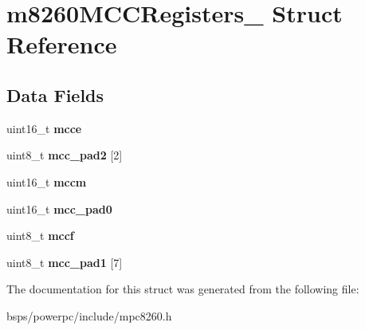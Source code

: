 \hypertarget{structm8260MCCRegisters__}{}\section{m8260\+M\+C\+C\+Registers\+\_\+ Struct Reference}
\label{structm8260MCCRegisters__}
\subsection*{Data Fields}
\begin{DoxyCompactItemize}
\item 
\mbox{\label{structm8260MCCRegisters___ac1afb10db9f2e528785d8507d55b3d5f}} 
uint16\+\_\+t {\bfseries mcce}
\item 
\mbox{\label{structm8260MCCRegisters___a15b07c55f206abc4ef4155d7b5a9d8fa}} 
uint8\+\_\+t {\bfseries mcc\+\_\+pad2} \mbox{[}2\mbox{]}
\item 
\mbox{\label{structm8260MCCRegisters___a19a32164a5a5fa88c4e9d60feaeb389b}} 
uint16\+\_\+t {\bfseries mccm}
\item 
\mbox{\label{structm8260MCCRegisters___abb24da9324a8a26625eedce43bba1f09}} 
uint16\+\_\+t {\bfseries mcc\+\_\+pad0}
\item 
\mbox{\label{structm8260MCCRegisters___a29835dcd17462953431b38ed0a85df0a}} 
uint8\+\_\+t {\bfseries mccf}
\item 
\mbox{\label{structm8260MCCRegisters___a04318032f1b9676d150a50898e7ebe31}} 
uint8\+\_\+t {\bfseries mcc\+\_\+pad1} \mbox{[}7\mbox{]}
\end{DoxyCompactItemize}


The documentation for this struct was generated from the following file\+:\begin{DoxyCompactItemize}
\item 
bsps/powerpc/include/mpc8260.\+h\end{DoxyCompactItemize}
